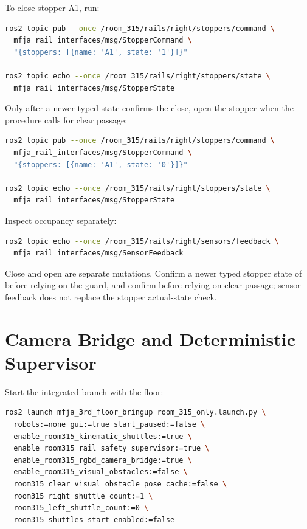 To close stopper A1, run:

\begin{lstlisting}[language=bash]
ros2 topic pub --once /room_315/rails/right/stoppers/command \
  mfja_rail_interfaces/msg/StopperCommand \
  "{stoppers: [{name: 'A1', state: '1'}]}"

ros2 topic echo --once /room_315/rails/right/stoppers/state \
  mfja_rail_interfaces/msg/StopperState
\end{lstlisting}

Only after a newer typed state confirms the close, open the stopper when the
procedure calls for clear passage:

\begin{lstlisting}[language=bash]
ros2 topic pub --once /room_315/rails/right/stoppers/command \
  mfja_rail_interfaces/msg/StopperCommand \
  "{stoppers: [{name: 'A1', state: '0'}]}"

ros2 topic echo --once /room_315/rails/right/stoppers/state \
  mfja_rail_interfaces/msg/StopperState
\end{lstlisting}

Inspect occupancy separately:

\begin{lstlisting}[language=bash]
ros2 topic echo --once /room_315/rails/right/sensors/feedback \
  mfja_rail_interfaces/msg/SensorFeedback
\end{lstlisting}

Close and open are separate mutations. Confirm a newer typed stopper state of
 before relying on the guard, and confirm  before relying on
clear passage; sensor feedback does not replace the stopper actual-state check.

\section{Camera Bridge and Deterministic Supervisor}

Start the integrated branch with the floor:

\begin{lstlisting}[language=bash]
ros2 launch mfja_3rd_floor_bringup room_315_only.launch.py \
  robots:=none gui:=true start_paused:=false \
  enable_room315_kinematic_shuttles:=true \
  enable_room315_rail_safety_supervisor:=true \
  enable_room315_rgbd_camera_bridge:=true \
  enable_room315_visual_obstacles:=false \
  room315_clear_visual_obstacle_pose_cache:=false \
  room315_right_shuttle_count:=1 \
  room315_left_shuttle_count:=0 \
  room315_shuttles_start_enabled:=false
\end{lstlisting}

